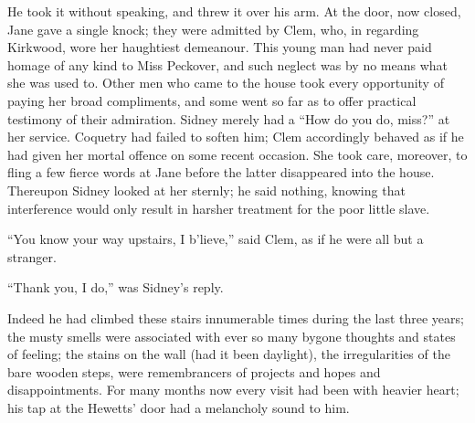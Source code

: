He took it without speaking, and threw it over his arm. At the door, now
closed, Jane gave a single knock; they were admitted by Clem, who, in
regarding Kirkwood, wore her haughtiest demeanour. This young man had
never paid homage of any kind to Miss Peckover, and such neglect was by
no means what she was used to. Other men who came to the house took
every opportunity of paying her broad compliments, and some went so far
as to offer practical testimony of their admiration. Sidney merely had a
``How do you do, miss?'' at her service. Coquetry had failed to soften
him; Clem accordingly behaved as if he had given her mortal offence on
some recent occasion. She took care, moreover, to fling a few fierce
words at Jane {\protect\hypertarget{35}{}{}}before the latter
disappeared into the house. Thereupon Sidney looked at her sternly; he
said nothing, knowing that interference would only result in harsher
treatment for the poor little slave.

``You know your way upstairs, I b'lieve,'' said Clem, as if he were all
but a stranger.

``Thank you, I do,'' was Sidney's reply.

Indeed he had climbed these stairs innumerable times during the last
three years; the musty smells were associated with ever so many bygone
thoughts and states of feeling; the stains on the wall (had it been
daylight), the irregularities of the bare wooden steps, were
remembrancers of projects and hopes and disappointments. For many months
now every visit had been with heavier heart; his tap at the Hewetts'
door had a melancholy sound to him.

